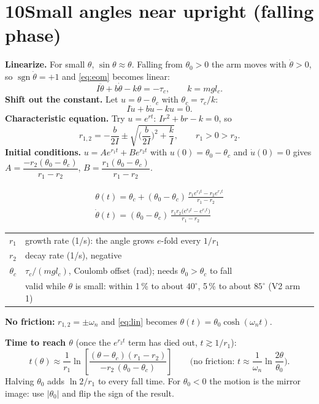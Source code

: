 \documentclass[11pt]{article}
\makeatletter
\newcommand{\sgn}{\operatorname{sgn}}
\newcommand{\where}[1]{\par\vspace{-2pt}{\small\color{muted}\textit{where}}\par\vspace{-2pt}
  {\small\renewcommand{\arraystretch}{1.08}\begin{tabular}{@{}>{$}r<{$}@{\;\;}l@{}}#1\end{tabular}}}
\makeatother
\begin{document}
\section*{10\quad Small angles near upright (falling phase)}
\textbf{Linearize.} For small $\theta$, $\sin\theta\approx\theta$. Falling from $\theta_0>0$ the arm moves with $\dot\theta>0$, so $\sgn\dot\theta=+1$ and \eqref{eq:eom} becomes linear:
\begin{equation}
I\ddot\theta+b\dot\theta-k\theta=-\tau_c,\qquad k=m g l_c .
\end{equation}
\textbf{Shift out the constant.} Let $u=\theta-\theta_c$ with $\theta_c=\tau_c/k$:
\begin{equation}
I\ddot u+b\dot u-k u=0 .
\end{equation}
\textbf{Characteristic equation.} Try $u=e^{rt}$: $I r^2+b r-k=0$, so
\begin{equation}
r_{1,2}=-\frac{b}{2I}\pm\sqrt{\Big(\frac{b}{2I}\Big)^2+\frac{k}{I}},\qquad r_1>0>r_2 .
\end{equation}
\textbf{Initial conditions.} $u=Ae^{r_1t}+Be^{r_2t}$ with $u(0)=\theta_0-\theta_c$ and $\dot u(0)=0$ gives $A=\dfrac{-r_2(\theta_0-\theta_c)}{r_1-r_2}$, $B=\dfrac{r_1(\theta_0-\theta_c)}{r_1-r_2}$.
\begin{result}[title={Small-angle fall from upright}]
\begin{gather}
\theta(t)=\theta_c+(\theta_0-\theta_c)\,\frac{r_1e^{r_2t}-r_2e^{r_1t}}{r_1-r_2} \label{eq:lin}\\[2pt]
\dot\theta(t)=(\theta_0-\theta_c)\,\frac{r_1r_2\big(e^{r_2t}-e^{r_1t}\big)}{r_1-r_2}
\end{gather}
\where{r_1 & growth rate (1/s): the angle grows $e$-fold every $1/r_1$\\ r_2 & decay rate (1/s), negative\\ \theta_c & $\tau_c/(m g l_c)$, Coulomb offset (rad); needs $\theta_0>\theta_c$ to fall\\ & valid while $\theta$ is small: within 1\,\% to about $40^\circ$, 5\,\% to about $85^\circ$ (V2 arm 1)}
\end{result}
\textbf{No friction:} $r_{1,2}=\pm\omega_n$ and \eqref{eq:lin} becomes $\theta(t)=\theta_0\cosh(\omega_n t)$.

\textbf{Time to reach $\theta$} (once the $e^{r_2t}$ term has died out, $t\gtrsim1/r_1$):
\begin{equation}
t(\theta)\approx\frac{1}{r_1}\ln\!\left[\frac{(\theta-\theta_c)(r_1-r_2)}{-r_2\,(\theta_0-\theta_c)}\right]
\qquad\Big(\text{no friction: } t\approx\frac{1}{\omega_n}\ln\frac{2\theta}{\theta_0}\Big).
\end{equation}
Halving $\theta_0$ adds $\ln 2/r_1$ to every fall time. For $\theta_0<0$ the motion is the mirror image: use $|\theta_0|$ and flip the sign of the result.
\end{document}
